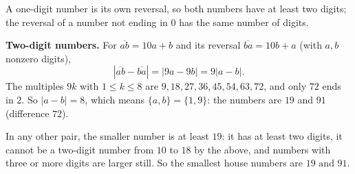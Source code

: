 A one-digit number is its own reversal, so both numbers have at least two digits; the reversal of a number not ending in $0$ has the same number of digits.

\textbf{Two-digit numbers.} For $\overline{ab}=10a+b$ and its reversal $\overline{ba}=10b+a$ (with $a,b$ nonzero digits),
\[\left|\overline{ab}-\overline{ba}\right|=|9a-9b|=9|a-b|.\]
The multiples $9k$ with $1\le k\le8$ are $9,18,27,36,45,54,63,72$, and only $72$ ends in $2$. So $|a-b|=8$, which means $\{a,b\}=\{1,9\}$: the numbers are $19$ and $91$ (difference $72$).

In any other pair, the smaller number is at least $19$: it has at least two digits, it cannot be a two-digit number from $10$ to $18$ by the above, and numbers with three or more digits are larger still. So the smallest house numbers are $\boxed{19\text{ and }91}$.
